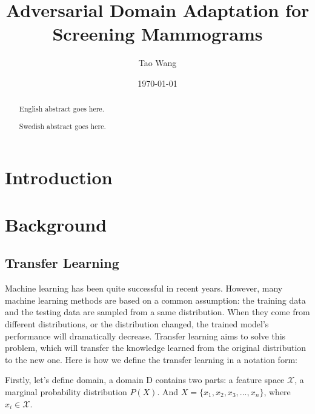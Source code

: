 \documentclass{kththesis}
\title{Adversarial Domain Adaptation for Screening Mammograms}
\author{Tao Wang}
\date{\today}
\begin{document}
\frontmatter

\titlepage

\begin{abstract}
  English abstract goes here.

\end{abstract}


\begin{otherlanguage}{swedish}
  \begin{abstract}
    Swedish abstract goes here.
  \end{abstract}
\end{otherlanguage}


\tableofcontents


\mainmatter


\chapter{Introduction}



\chapter{Background}
\section{Transfer Learning}
Machine learning has been quite successful in recent years. However, many machine learning methods are based on a common assumption: the training data and the testing data are sampled from a same distribution. When they come from different distributions, or the distribution changed, the trained model's performance will dramatically decrease. Transfer learning aims to solve this problem, which will transfer the knowledge learned from the original distribution to the new one. Here is how we define the transfer learning in a notation form\cite{pan2010survey}:

\noindent Firstly, let's define domain, a domain D contains two parts: a feature space  $\mathcal{X}$, a marginal probability distribution $P(X)$. And $X = \{x_1,x_2,x_3,...,x_n\}$, where $x_i \in \mathcal{X}$. 
\end{document}

